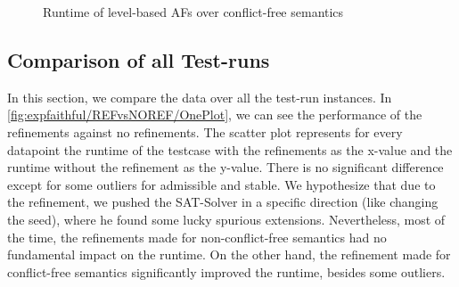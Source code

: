 \begin{figure}[H]
    \centering
    \caption{Runtime of level-based AFs over conflict-free semantics}
    \label{fig:expfaithful/REFvsNOREF/level-based}
\end{figure}




\subsection{Comparison of all Test-runs}

In this section, we compare the data over all the test-run instances. In \cref{fig:expfaithful/REFvsNOREF/OnePlot}, we can see the performance of the refinements against no refinements. The scatter plot represents for every datapoint the runtime of the testcase with the refinements as the x-value and the runtime without the refinement as the y-value. There is no significant difference except for some outliers for admissible and stable. We hypothesize that due to the refinement, we pushed the SAT-Solver in a specific direction (like changing the seed), where he found some lucky spurious extensions. Nevertheless, most of the time, the refinements made for non-conflict-free semantics had no fundamental impact on the runtime. On the other hand, the refinement made for conflict-free semantics significantly improved the runtime, besides some outliers.

